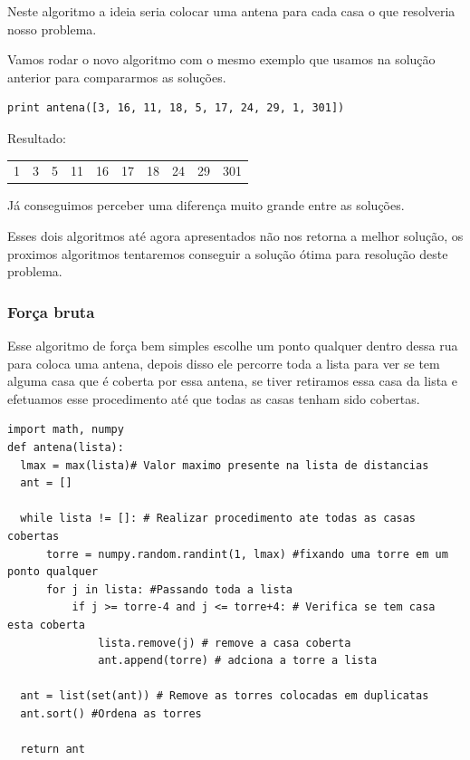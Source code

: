 \documentclass[11pt]{article}
\begin{document}
Neste algoritmo a ideia seria colocar uma antena para cada casa o que
resolveria nosso problema.

Vamos rodar o novo algoritmo com o mesmo exemplo que usamos na solução
anterior para compararmos as soluções.

\begin{verbatim}
print antena([3, 16, 11, 18, 5, 17, 24, 29, 1, 301])
\end{verbatim}

Resultado:
\begin{center}
\begin{tabular}{rrrrrrrrrr}
1 & 3 & 5 & 11 & 16 & 17 & 18 & 24 & 29 & 301\\
\end{tabular}
\end{center}

Já conseguimos perceber uma diferença muito grande entre as soluções.

Esses dois algoritmos até agora apresentados não nos retorna a melhor
solução, os proximos algoritmos tentaremos conseguir a solução ótima
para resolução deste problema.

\subsubsection{Força bruta}
\label{sec-5-3-2}
\label{sec-3-2}

Esse algoritmo de força bem simples escolhe um ponto qualquer dentro
dessa rua para coloca uma antena, depois disso ele percorre toda a
lista para ver se tem alguma casa que é coberta por essa antena, se
tiver retiramos essa casa da lista e efetuamos esse procedimento até
que todas as casas tenham sido cobertas.


\begin{verbatim}
import math, numpy
def antena(lista):
  lmax = max(lista)# Valor maximo presente na lista de distancias
  ant = []

  while lista != []: # Realizar procedimento ate todas as casas cobertas
      torre = numpy.random.randint(1, lmax) #fixando uma torre em um ponto qualquer
      for j in lista: #Passando toda a lista
          if j >= torre-4 and j <= torre+4: # Verifica se tem casa esta coberta
              lista.remove(j) # remove a casa coberta
              ant.append(torre) # adciona a torre a lista

  ant = list(set(ant)) # Remove as torres colocadas em duplicatas
  ant.sort() #Ordena as torres

  return ant
\end{verbatim}
\end{document}
